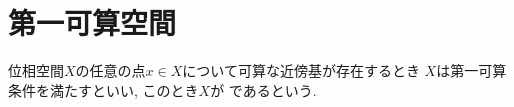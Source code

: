 \documentclass[uplatex, dvipdfmx, a4paper, 12pt, class=jsbook, crop=false]{standalone}
\begin{document}
\section{第一可算空間}
\label{sec:first-countable-spaces}

\begin{definition}
	位相空間$ X $の任意の点$ x \in X $について可算な近傍基が存在するとき
	$ X $は第一可算条件を満たすといい, このとき$ X $が
	であるという.
\end{definition}
\end{document}
